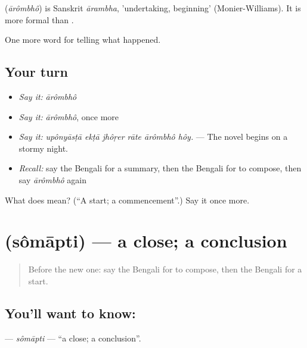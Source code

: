 \begin{cousinweb}
\textbf{} (\emph{ārômbhô}) is Sanskrit \emph{ārambha}, 'undertaking, beginning' (Monier-Williams). It is more formal than \textbf{}.
\end{cousinweb}

\begin{grammarlens}[title={What you've built}]
One more word for telling what happened.
\end{grammarlens}

\subsection*{Your turn}
\begin{itemize}
\raggedright
  \item \emph{Say it:} \emph{ārômbhô}
  \item \emph{Say it:} \emph{ārômbhô}, once more
  \item \emph{Say it:} \emph{upônyāsṭā ekṭā jhôṛer rāte ārômbhô hôy.} — The novel begins on a stormy night.
  \item \emph{Recall:} say the Bengali for a summary, then the Bengali for to compose, then say \emph{ārômbhô} again
\end{itemize}

\begin{tcolorbox}[breakable,colback=teal!4,colframe=teal!35!black,title={Before you move on}]
What does  mean? (\textquotedblleft{}A start; a commencement\textquotedblright{}.) Say it once more.
\end{tcolorbox}
\section[\texorpdfstring{\bn{সমাপ্তি} (sômāpti)}{সমাপ্তি (sômāpti)}]{ (sômāpti) — a close; a conclusion}

\label{lesson:BN-C329-somapti}



\begin{quote}
Before the new one: say the Bengali for to compose, then the Bengali for a start.
\end{quote}

\subsection*{You'll want to know: }
\textbf{} — \emph{sômāpti} — \textquotedblleft{}a close; a conclusion\textquotedblright{}.

